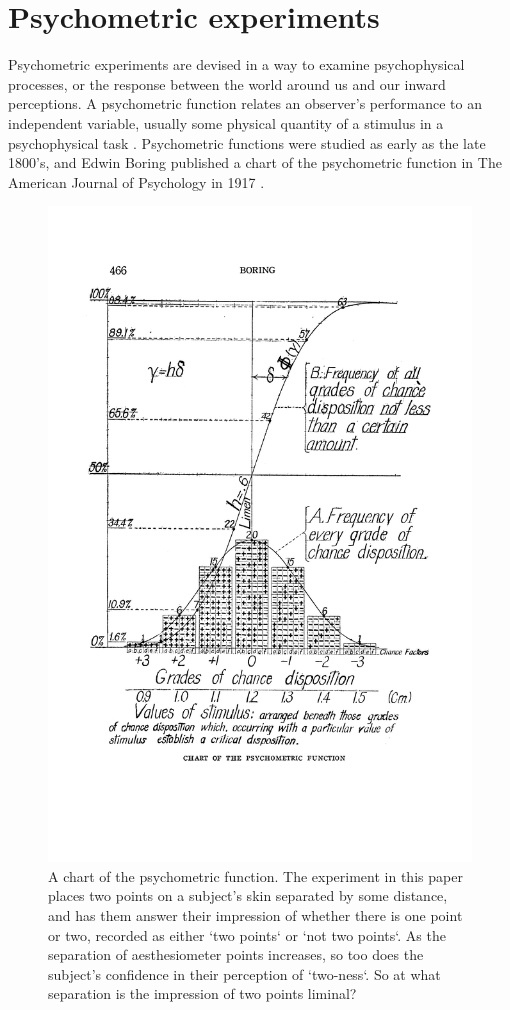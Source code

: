 \documentclass[11pt, oneside, openany]{scrbook}
\begin{document}
\hypertarget{psycho-experiments}{%
\section{Psychometric experiments}\label{psycho-experiments}}

Psychometric experiments are devised in a way to examine psychophysical processes, or the response between the world around us and our inward perceptions. A psychometric function relates an observer's performance to an independent variable, usually some physical quantity of a stimulus in a psychophysical task \citep{wichmann2001a}. Psychometric functions were studied as early as the late 1800's, and Edwin Boring published a chart of the psychometric function in The American Journal of Psychology in 1917 \citep{boring1917chart}.

\begin{figure}

{\centering \includegraphics[width=0.85\linewidth]{figures/chart_of_pf} 

}

\caption{A chart of the psychometric function. The experiment in this paper places two points on a subject's skin separated by some distance, and has them answer their impression of whether there is one point or two, recorded as either `two points` or `not two points`. As the separation of aesthesiometer points increases, so too does the subject's confidence in their perception of `two-ness`. So at what separation is the impression of two points liminal?}\label{fig:ch020-chart-of-pf}
\end{figure}
\end{document}
